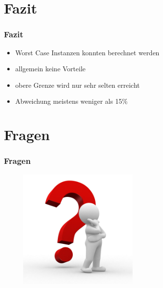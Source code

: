 \documentclass[12pt]{beamer}
\begin{document}
    \section{Fazit}
    \begin{frame}
        \frametitle{Fazit}
	    \begin{itemize}
                \item Worst Case Instanzen konnten berechnet werden
                \item allgemein keine Vorteile
                \item obere Grenze wird nur sehr selten erreicht
                \item Abweichung meistens weniger als 15\%
            \end{itemize}
    \end{frame}

    \section{Fragen}
    \begin{frame}
    \frametitle{Fragen}
        \begin{figure}[H]
	    \centering
	        \includegraphics[width=6cm]{gfx/questionmark}
        \end{figure}
    \end{frame}
\end{document}

